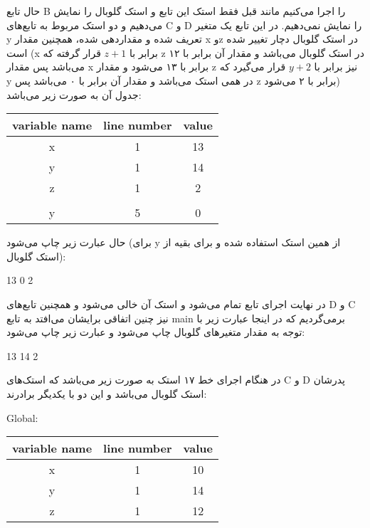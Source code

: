 \begin{enumerate}
\begin{latin}
\begin{center}
\begin{tabular}{|c|c|c|}
			\end{tabular}
		\end{center}
	\end{latin}
حال تابع B را اجرا می‌کنیم مانند قبل فقط استک این تابع و استک گلوبال را نمایش می‌دهیم و دو استک مربوط به تابع‌های C و D را نمایش نمی‌دهیم. در این تابع یک متغیر y تعریف شده و مقداردهی شده، همچنین مقدار x وz در استک گلوبال دچار تغییر شده است (x برابر با $z+1$ قرار گرفته که z در استک گلوبال می‌باشد و مقدار آن برابر با ۱۲ می‌باشد پس مقدار x برابر با ۱۳ می‌شود و مقدار z نیز برابر با $y+2$ قرار می‌‌گیرد که y در همی استک می‌باشد و مقدار آن برابر با ۰ می‌باشد پس z برابر با ۲ می‌شود) جدول آن به صورت زیر می‌باشد:
\begin{latin}
	\begin{center}
		\begin{tabular}{|c|c|c|}
			\hline
			variable name & line number & value\\
			\hline
			x & 1 & 13\\
			\hline
			y & 1 & 14\\
			\hline
			z & 1 & 2\\
			\hline
			\rowcolor{black} \multicolumn{3}{|c|}{}\\
			\hline
			y & 5 & 0\\
			\hline
		\end{tabular}
	\end{center}
\end{latin}
حال عبارت زیر چاپ می‌شود (برای y از همین استک استفاده شده و برای بقیه از  استک گلوبال):
\begin{center}
	\begin{latin}
		13 0 2
\end{latin}
\end{center}
در نهایت اجرای تابع تمام می‌شود و استک آن خالی می‌شود و همچنین تابع‌های D و C نیز چنین اتفاقی برایشان می‌افتد به تابع main برمی‌گردیم که در اینجا عبارت زیر با توجه به مقدار متغیر‌های گلوبال چاپ می‌شود و عبارت زیر چاپ می‌شود:
\begin{center}
	\begin{latin}
		13 14 2
	\end{latin}
	
\end{center}
در هنگام اجرای خط ۱۷ استک به صورت زیر می‌باشد که استک‌های C و D پدرشان استک گلوبال می‌باشد و این دو با یکدیگر برادرند:\\
\begin{latin}
	Global:
\end{latin}
\begin{center}
	\begin{latin}
		\begin{tabular}{|c|c|c|}
			\hline
			variable name & line number & value\\
			\hline
			x & 1 & 10\\
			\hline
			y & 1 & 14\\
			\hline
			z & 1 & 12\\
			\hline
			

\end{tabular}
\end{latin}
\end{center}
\end{enumerate}
